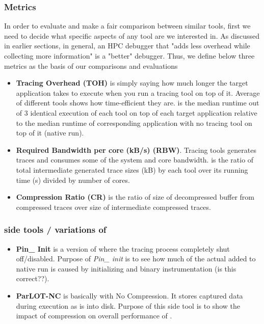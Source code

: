 \subsubsection{Metrics}
In order to evaluate and make a fair comparison between similar tools, first we need to decide what specific aspects of any tool are we interested in. As discussed in earlier sections, in general, an HPC debugger that "adds less overhead while collecting more information" is a "better" debugger. Thus, we define below three metrics as the basis of our comparisons and evaluations
\begin{itemize}
\item \textbf{Tracing Overhead (TOH)} is simply saying how much longer the target application takes to execute when you run a tracing tool on top of it. Average \toh of different tools shows how time-efficient they are. \toh is the median runtime out of 3 identical execution of each tool on top of each target application relative to the median runtime of corresponding application with no tracing tool on top of it (native run). 
\item  \textbf{Required Bandwidth per core (kB/s) (RBW)}. Tracing tools generates traces and consumes some of the system and core bandwidth. \rbw is the ratio of total intermediate generated trace sizes (kB) by each tool over its running time (s) divided by number of cores.
\item \textbf{Compression Ratio (CR)} is the ratio of size of decompressed buffer from compressed traces over size of intermediate compressed traces.
\end{itemize}



\subsubsection{\parlot side tools / variations of \parlot}


\begin{itemize}
\item \textbf{Pin\_ Init} is a version of \parlot where the tracing process completely shut off/disabled. Purpose of \textit{Pin\_ init} is to see how much of the actual \toh added to native run is caused by initializing \pin and binary instrumentation (is this correct??).
\item \textbf{ParLOT-NC} is basically \parlot with No Compression. It stores captured data during execution as is into disk. Purpose of this side tool is to show the impact of compression on overall performance of \parlot.
\end{itemize}